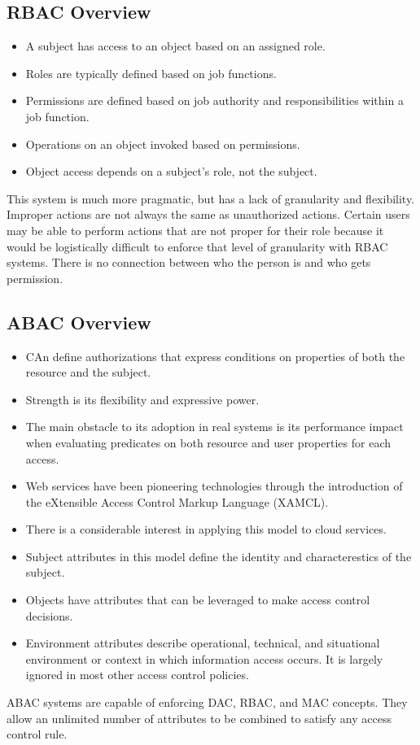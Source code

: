 \documentclass{math}
\begin{document}
\subsection*{RBAC Overview}
\begin{itemize}
  \item A subject has access to an object based on an assigned role.
  \item Roles are typically defined based on job functions.
  \item Permissions are defined based on job authority and responsibilities
  within a job function.
  \item Operations on an object invoked based on permissions.
  \item Object access depends on a subject's role, not the subject.
\end{itemize}
This system is much more pragmatic, but has a lack of granularity and
flexibility. Improper actions are not always the same as unauthorized actions.
Certain users may be able to perform actions that are not proper for their role
because it would be logistically difficult to enforce that level of granularity
with RBAC systems. There is no connection between who the person is and who gets
permission.

\subsection*{ABAC Overview}
\begin{itemize}
  \item CAn define authorizations that express conditions on properties of both
  the resource and the subject.
  \item Strength is its flexibility and expressive power.
  \item The main obstacle to its adoption in real systems is its performance
  impact when evaluating predicates on both resource and user properties for
  each access.
  \item Web services have been pioneering technologies through the introduction
  of the eXtensible Access Control Markup Language (XAMCL).
  \item There is a considerable interest in applying this model to cloud
  services.
  \item Subject attributes in this model define the identity and
  characterestics of the subject.
  \item Objects have attributes that can be leveraged to make access control
  decisions.
  \item Environment attributes describe operational, technical, and situational
  environment or context in which information access occurs. It is largely
  ignored in most other access control policies.
\end{itemize}
ABAC systems are capable of enforcing DAC, RBAC, and MAC concepts. They allow
an unlimited number of attributes to be combined to satisfy any access control
rule.
\end{document}
